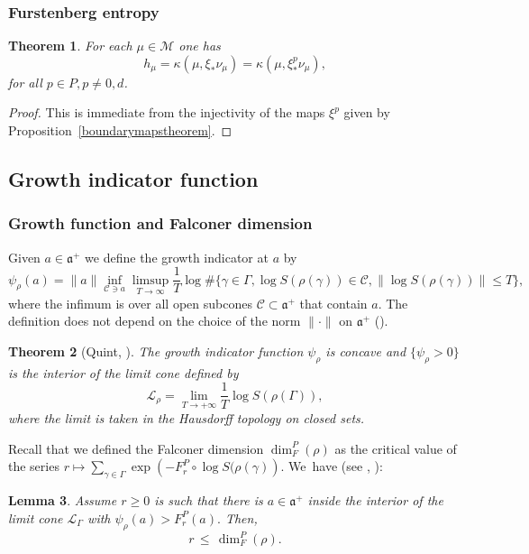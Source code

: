\documentclass[10pt]{amsart}
\newtheorem{theorem}{Theorem}[section]
\newtheorem{lemma}[theorem]{Lemma}
\newcommand{\CC}{\mathcal C}
\newcommand{\M}{\mathcal M}
\let\G\Gamma
\let\g\gamma
\newcommand{\aaa}{\mathfrak a}
\let\Subsection\subsection\let\Subsubsection\subsubsection
\begin{document}
\Subsubsection{Furstenberg entropy}

\begin{theorem}\label{entropytheorem}
For each \(\mu \in \M\) one has
\[
h_\mu = \kappa(\mu,\xi_*\nu_\mu) = \kappa(\mu,\xi^p_*\nu_\mu),
\]
for all \(p \in P, p\not = 0,d\).
\end{theorem}
\begin{proof}
This is immediate from the injectivity of the maps \(\xi^p\) given by Proposition~\ref{boundarymapstheorem}.
\end{proof}

\Subsection{Growth indicator function}
\subsubsection{Growth function and Falconer dimension}

Given \(a \in \aaa^+\) we define the growth indicator at \(a\) by
\begin{equation}\label{growth}
\psi_\rho(a) = \| a\| \inf_{\CC \ni a}
\limsup_{T \to \infty } \frac{1}{T}\log \# \{ \g \in \G, \log S(\rho(\g)) \in \CC, \|\log S(\rho(\g)) \| \leq T\}, \end{equation}
where the infimum is over all open subcones \(\CC \subset \aaa^+\) that contain \(a\). The definition does not depend on the choice of the norm \(\|{\cdot}\| \) on \(\aaa^+\) (\cite{Qui02a}).

\begin{theorem}[Quint, \cite{Qui02a}]\label{cone}
The growth indicator function \(\psi_\rho\) is concave and \(\lbrace \psi_\rho > 0\rbrace\) is the interior of the limit cone defined by
\[
\mathcal{L}_\rho = \lim_{T \to +\infty}\frac{1}{T}\log S(\rho(\Gamma)),
\]
where the limit is taken in the Hausdorff topology on closed sets.
\end{theorem}

Recall that we defined the Falconer dimension \(\dim_F^P(\rho)\) as the critical value of the series
\(r \mapsto \sum_{\gamma \in \Gamma}\exp\left(-F^P_r\circ \log S(\rho(\gamma)\right)\). We~have (see \cite[Lem.\,4.2]{sambarino}, \cite[Lem.\,III.1.3]{Qui02a}):

\begin{lemma}\label{falconer2}
Assume \(r\ge 0 \) is such that there is \(a \in \aaa^+ \) inside the interior of the limit cone \(\mathcal{L}_\Gamma \) with \(\psi_\rho (a) > F^P_r (a). \) Then,
\[
 r \, \le \, \dim_F^P (\rho).
\]
\end{lemma}
\end{document}
